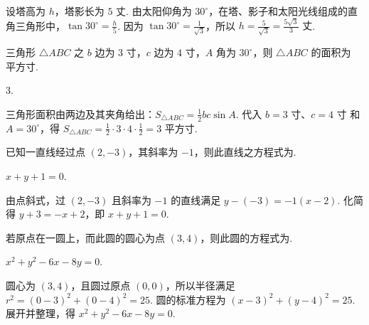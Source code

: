 \documentclass[UTF8,a4paper,oneside,11pt]{ctexbook}
\begin{document}
\begin{solution}
设塔高为 \(h\)，塔影长为 \(5\text{ 丈}\). 由太阳仰角为 \(30^{\circ}\)，在塔、影子和太阳光线组成的直角三角形中，\(\tan30^{\circ}=\frac{h}{5}\). 因为 \(\tan30^{\circ}=\frac{1}{\sqrt3}\)，所以 \(h=\frac{5}{\sqrt3}=\frac{5\sqrt3}{3}\text{ 丈}\).
\end{solution}

\begin{problem}
三角形 \(\triangle ABC\) 之 \(b\) 边为 \(3\text{ 寸}\)，\(c\) 边为 \(4\text{ 寸}\)，\(A\) 角为 \(30^{\circ}\)，则 \(\triangle ABC\) 的面积为\fillinblank{}\(\text{平方寸}\).
\end{problem}

\begin{answer}
\(3\).
\end{answer}

\begin{solution}
三角形面积由两边及其夹角给出：\(S_{\triangle ABC}=\frac12bc\sin A\). 代入 \(b=3\text{ 寸}\)、\(c=4\text{ 寸}\) 和 \(A=30^{\circ}\)，得 \(S_{\triangle ABC}=\frac12\cdot3\cdot4\cdot\frac12=3\text{ 平方寸}\).
\end{solution}

\begin{problem}
已知一直线经过点 \(\left( 2,-3 \right)\)，其斜率为 \(-1\)，则此直线之方程式为\fillinblank{}.
\end{problem}

\begin{answer}
\(x + y + 1 = 0\).
\end{answer}

\begin{solution}
由点斜式，过 \((2,-3)\) 且斜率为 \(-1\) 的直线满足 \(y-(-3)=-1(x-2)\). 化简得 \(y+3=-x+2\)，即 \(x+y+1=0\).
\end{solution}

\begin{problem}
若原点在一圆上，而此圆的圆心为点 \(\left( 3,4 \right)\)，则此圆的方程式为\fillinblank{}.
\end{problem}

\begin{answer}
\(x^{2} + y^{2} - 6x - 8y = 0\).
\end{answer}

\begin{solution}
圆心为 \((3,4)\)，且圆过原点 \((0,0)\)，所以半径满足 \(r^{2}=(0-3)^{2}+(0-4)^{2}=25\). 圆的标准方程为 \((x-3)^{2}+(y-4)^{2}=25\). 展开并整理，得 \(x^{2}+y^{2}-6x-8y=0\).
\end{solution}
\end{document}
